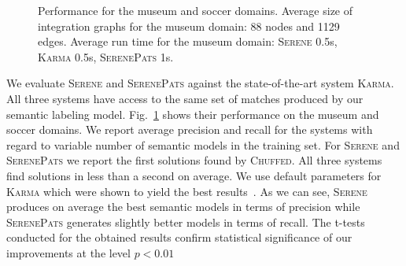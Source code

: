 \documentclass[letterpaper]{article} %
\newcommand{\chuffed}{\textsc{Chuffed}}
\newcommand{\karma}{\textsc{Karma}}
\newcommand{\serene}{\textsc{Serene}}
\newcommand{\serenepats}{\textsc{SerenePats}}
\begin{document}
\begin{figure}[!b]
\begin{minipage}[b]{0.5\linewidth}
\label{fig:soccerrec}
\end{minipage}%
\vspace*{-3mm}
\caption{Performance for the museum and soccer domains. 
Average size of integration graphs for the museum domain: 88 nodes and 1129 
edges.
Average run time for the museum domain: \serene{} 0.5s, \karma{} 0.5s, \serenepats{} 1s. \label{fig:perf}}
\vspace{-3mm}
\end{figure}


We evaluate \serene{} and \serenepats{} against the state-of-the-art system \karma{}.
All three systems have access to the same set of matches produced by our semantic labeling model.
Fig.~\ref{fig:perf} shows their performance on the museum and soccer domains.
We report average precision and recall for the systems with regard to variable 
number of semantic models in the training set.
For \serene{} and \serenepats{} we report the first solutions found by
\chuffed{}. All three systems find solutions in less than a second on average.
We use default parameters for \karma{} which were shown to yield the best 
results~\cite{taheriyan2016learning}.
As we can see, \serene{} produces on average the best semantic models in terms 
of precision while \serenepats{} generates slightly better models in terms of 
recall.
The t-tests conducted for the obtained results confirm statistical significance of our improvements at the level $p<0.01$
\end{document}

